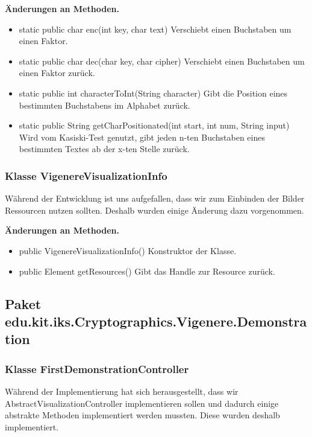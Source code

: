 \documentclass{article}
\begin{document}
    \textbf{Änderungen an Methoden.}
      \begin{itemize}
		\item static public char enc(int key, char text)\newline
              Verschiebt einen Buchstaben um einen Faktor.
        \item static public char dec(char key, char cipher)\newline
              Verschiebt einen Buchstaben um einen Faktor zurück.
		\item static public int characterToInt(String character)\newline
              Gibt die Position eines bestimmten Buchstabens im Alphabet zurück.
		\item static public String getCharPositionated(int start, int num, String input)\newline
              Wird vom Kasiski-Test genutzt, gibt jeden n-ten Buchstaben eines bestimmten Textes ab der x-ten Stelle zurück.			
      \end{itemize}

    \subsubsection{Klasse VigenereVisualizationInfo}
	Während der Entwicklung ist uns aufgefallen, dass wir zum Einbinden der Bilder Ressourcen nutzen sollten. Deshalb wurden einige Änderung dazu vorgenommen.\newline
           
    \textbf{Änderungen an Methoden.}
      \begin{itemize}
		\item public VigenereVisualizationInfo()\newline
              Konstruktor der Klasse.
        \item public Element getResources()\newline
              Gibt das Handle zur Resource zurück.
      \end{itemize}

  \subsection{Paket edu.kit.iks.Cryptographics.Vigenere.Demonstration}
    \subsubsection{Klasse FirstDemonstrationController}
	Während der Implementierung hat sich herausgestellt, dass wir AbstractVisualizationController implementieren sollen und dadurch 
	einige abstrakte Methoden implementiert werden mussten. Diese wurden deshalb implementiert.\newline
           
\end{document}
